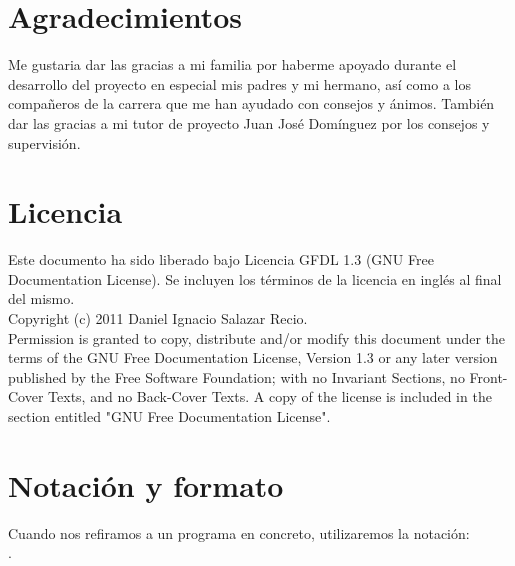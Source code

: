 

\section*{Agradecimientos}

Me gustaria dar las gracias a mi familia por haberme apoyado durante el desarrollo del proyecto en especial mis padres y mi hermano, así como a los compañeros de la carrera que me han ayudado con consejos y ánimos. También dar las gracias a mi tutor de proyecto Juan José Domínguez por los consejos y supervisión.

\cleardoublepage

\section*{Licencia} %

Este documento ha sido liberado bajo Licencia GFDL 1.3 (GNU Free
Documentation License). Se incluyen los términos de la licencia en
inglés al final del mismo.\\

Copyright (c) 2011 Daniel Ignacio Salazar Recio.\\

Permission is granted to copy, distribute and/or modify this document under the
terms of the GNU Free Documentation License, Version 1.3 or any later version
published by the Free Software Foundation; with no Invariant Sections, no
Front-Cover Texts, and no Back-Cover Texts. A copy of the license is included in
the section entitled "GNU Free Documentation License".\\

\cleardoublepage

\section*{Notación y formato}

Cuando nos refiramos a un programa en concreto, utilizaremos la
notación: \\ .\\

